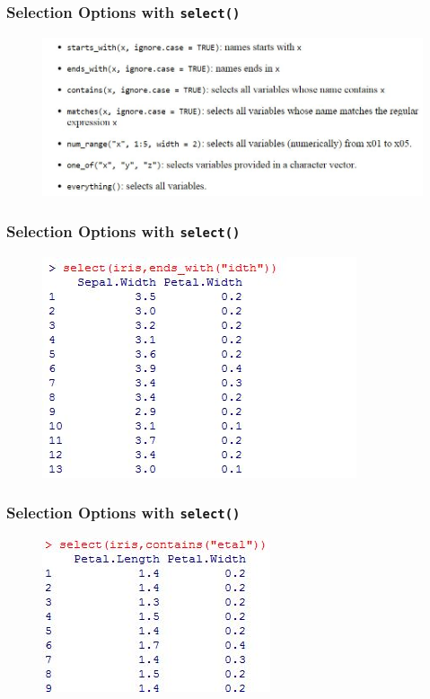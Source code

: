 \documentclass{beamer}
\begin{document}
	\begin{frame}
		\frametitle{Selection Options with \texttt{select()}}
		\begin{figure}
			\centering
			\includegraphics[width=01.05\linewidth]{images/selectoptions}
		\end{figure}
		
	\end{frame}
	\begin{frame}
		\frametitle{Selection Options with \texttt{select()}}
		
		\begin{figure}
			\centering
			\includegraphics[width=0.69\linewidth]{images/selectendswith}
		\end{figure}
		
	\end{frame}
	
	
	\begin{frame}
		\frametitle{Selection Options with \texttt{select()}}
		
		\begin{figure}
			\centering
			\includegraphics[width=0.69\linewidth]{images/selectioncontaints}
		\end{figure}
		
	\end{frame}
	
\end{document}
